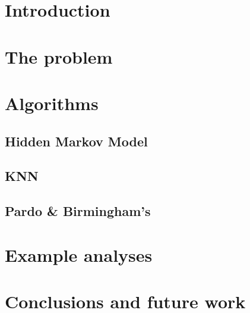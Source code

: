 
\section{Introduction}
\label{sec:introduction}











\section{The problem}
\label{sec:problem}

\section{Algorithms}
\label{sec:algorithms}

\subsection{Hidden Markov Model}
\label{sec:hidden-markov-model}

\subsection{KNN}
\label{sec:knn}

\subsection{Pardo \& Birmingham's}
\label{sec:pardo--birminghams}

\section{Example analyses}
\label{sec:example-analyses}

\section{Conclusions and future work}
\label{sec:concl-future-work}


